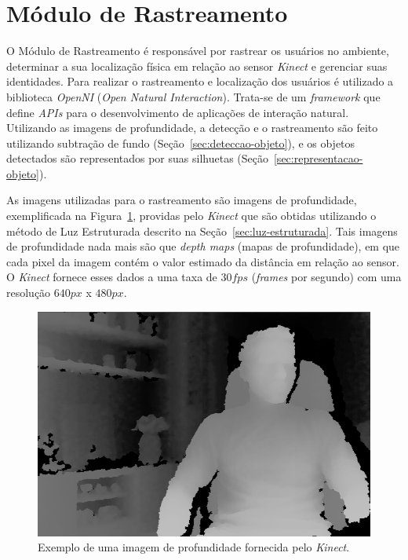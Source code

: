\section{Módulo de Rastreamento}

	O Módulo de Rastreamento é responsável por rastrear os usuários no
	ambiente, determinar a sua localização física em relação ao sensor \textit{Kinect} e
	gerenciar suas identidades. Para realizar o rastreamento e localização dos
	usuários é utilizado a biblioteca \textit{OpenNI} (\textit{Open Natural
	Interaction}). Trata-se de um \textit{framework} que define \textit{APIs} para
	o desenvolvimento de aplicações de interação natural. Utilizando as imagens de
	profundidade, a detecção e o rastreamento são feito utilizando subtração de
	fundo (Seção~\ref{sec:deteccao-objeto}), e os objetos detectados são
	representados por suas silhuetas (Seção~\ref{sec:representacao-objeto}).

	As imagens utilizadas para o rastreamento são imagens de profundidade,
	exemplificada na Figura~\ref{fig:depthmaps}, providas pelo \textit{Kinect} que
	são obtidas utilizando o método de Luz Estruturada descrito na
	Seção~\ref{sec:luz-estruturada}. Tais imagens de profundidade nada mais são
	que \textit{depth maps} (mapas de profundidade), em que cada pixel da imagem
	contém o valor estimado da distância em relação ao sensor. O \textit{Kinect}
	fornece esses dados a uma taxa de $\displaystyle 30 fps$ (\textit{frames} por
	segundo) com uma resolução $\displaystyle 640px$ x $\displaystyle 480px$.
	

	\begin{figure}[htb]
		\begin{center}
			\includegraphics[scale=0.4]{figuras/4.ProblemaEProposta/mapa-profundidade.png}
		\end{center}
		\caption{Exemplo de uma imagem de profundidade fornecida pelo \textit{Kinect}.}
		\label{fig:depthmaps}
	\end{figure}


